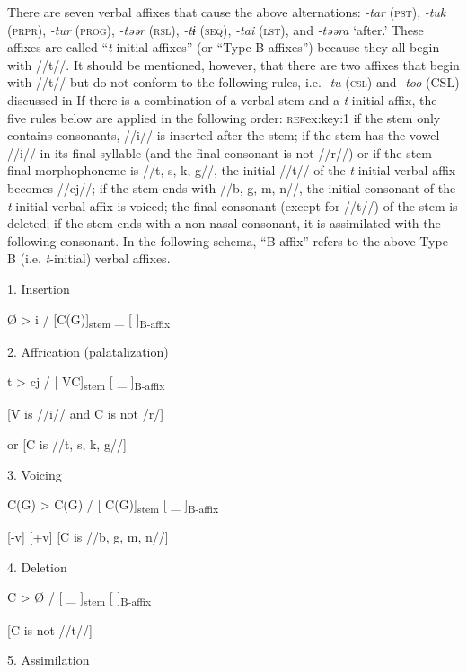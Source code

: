 There are seven verbal affixes that cause the above alternations: \textit{{}-tar} (\textsc{pst}), \textit{{}-tuk} (\textsc{prpr}), \textit{{}-tur} (\textsc{prog}), \textit{{}-təər} (\textsc{rsl}), \textit{-tɨ} (\textsc{seq}), \textit{{}-tai} (\textsc{lst}), and \textit{{}-təəra} ‘after.’ These affixes are called “\textit{t}{}-initial affixes” (or “Type-B affixes”) because they all begin with //t//. It should be mentioned, however, that there are two affixes that begin with //t// but do not conform to the following rules, i.e. \textit{{}-tu} (\textsc{csl}) and \textit{{}-too} (CSL) discussed in  If there is a combination of a verbal stem and a \textit{t}{}-initial affix, the five rules below are applied in the following order: \textsc{ref}{ex:key:1} if the stem only contains consonants, //i// is inserted after the stem;  if the stem has the vowel //i// in its final syllable (and the final consonant is not //r//) or if the stem-final morphophoneme is //t, s, k, g//, the initial //t// of the \textit{t}{}-initial verbal affix becomes //cj//;  if the stem ends with //b, g, m, n//, the initial consonant of the \textit{t}{}-initial verbal affix is voiced;  the final consonant (except for //t//) of the stem is deleted;  if the stem ends with a non-nasal consonant, it is assimilated with the following consonant. In the following schema, “B-affix” refers to the above Type-B (i.e. \textit{t}{}-initial) verbal affixes.

\ea\label{ex:8-13}
  1.  Insertion

    Ø  >  i  /  [C(G)]\textsubscript{stem}  \_  [   ]\textsubscript{B-affix}

  2.  Affrication (palatalization)

    t  >  cj  /  [   VC]\textsubscript{stem}  [ \_  ]\textsubscript{B-affix}

            [V is //i// and C is not /r/]

or [C is //t, s, k, g//]

  3.  Voicing

    C(G)  >  C(G)  /  [   C(G)]\textsubscript{stem}  [ \_  ]\textsubscript{B-affix}

    [-v]    [+v]    [C is //b, g, m, n//]

  4.  Deletion

    C  >  Ø  /  [   \_ ]\textsubscript{stem}  [   ]\textsubscript{B-affix}

    [C is not //t//]

  5.  Assimilation

